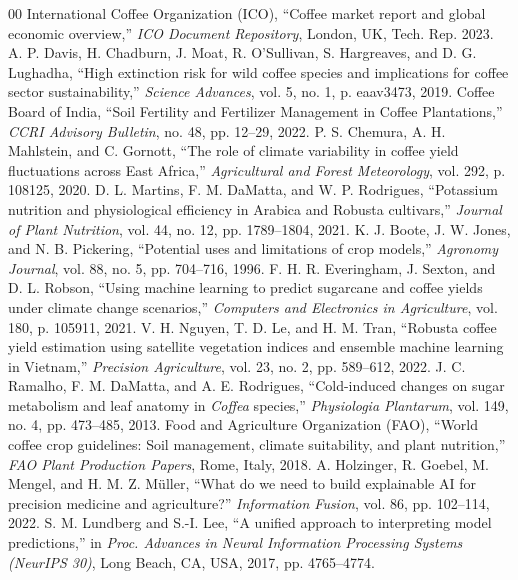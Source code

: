 \documentclass[conference]{IEEEtran}
\begin{document}
\begin{thebibliography}{00}
 International Coffee Organization (ICO), ``Coffee market report and global economic overview,'' \textit{ICO Document Repository}, London, UK, Tech. Rep. 2023.
 A. P. Davis, H. Chadburn, J. Moat, R. O'Sullivan, S. Hargreaves, and D. G. Lughadha, ``High extinction risk for wild coffee species and implications for coffee sector sustainability,'' \textit{Science Advances}, vol. 5, no. 1, p. eaav3473, 2019.
 Coffee Board of India, ``Soil Fertility and Fertilizer Management in Coffee Plantations,'' \textit{CCRI Advisory Bulletin}, no. 48, pp. 12--29, 2022.
 P. S. Chemura, A. H. Mahlstein, and C. Gornott, ``The role of climate variability in coffee yield fluctuations across East Africa,'' \textit{Agricultural and Forest Meteorology}, vol. 292, p. 108125, 2020.
 D. L. Martins, F. M. DaMatta, and W. P. Rodrigues, ``Potassium nutrition and physiological efficiency in Arabica and Robusta cultivars,'' \textit{Journal of Plant Nutrition}, vol. 44, no. 12, pp. 1789--1804, 2021.
 K. J. Boote, J. W. Jones, and N. B. Pickering, ``Potential uses and limitations of crop models,'' \textit{Agronomy Journal}, vol. 88, no. 5, pp. 704--716, 1996.
 F. H. R. Everingham, J. Sexton, and D. L. Robson, ``Using machine learning to predict sugarcane and coffee yields under climate change scenarios,'' \textit{Computers and Electronics in Agriculture}, vol. 180, p. 105911, 2021.
 V. H. Nguyen, T. D. Le, and H. M. Tran, ``Robusta coffee yield estimation using satellite vegetation indices and ensemble machine learning in Vietnam,'' \textit{Precision Agriculture}, vol. 23, no. 2, pp. 589--612, 2022.
 J. C. Ramalho, F. M. DaMatta, and A. E. Rodrigues, ``Cold-induced changes on sugar metabolism and leaf anatomy in \textit{Coffea} species,'' \textit{Physiologia Plantarum}, vol. 149, no. 4, pp. 473--485, 2013.
 Food and Agriculture Organization (FAO), ``World coffee crop guidelines: Soil management, climate suitability, and plant nutrition,'' \textit{FAO Plant Production Papers}, Rome, Italy, 2018.
 A. Holzinger, R. Goebel, M. Mengel, and H. M. Z. Müller, ``What do we need to build explainable AI for precision medicine and agriculture?'' \textit{Information Fusion}, vol. 86, pp. 102--114, 2022.
 S. M. Lundberg and S.-I. Lee, ``A unified approach to interpreting model predictions,'' in \textit{Proc. Advances in Neural Information Processing Systems (NeurIPS 30)}, Long Beach, CA, USA, 2017, pp. 4765--4774.

\end{thebibliography}
\end{document}
